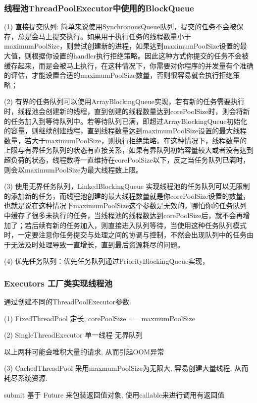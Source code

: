 \subsubsection{线程池ThreadPoolExecutor中使用的BlockQueue}
(1) 直接提交队列: 简单来说使用SynchronousQueue队列，提交的任务不会被保存，总是会马上提交执行。如果用于执行任务的线程数量小于maximumPoolSize，则尝试创建新的进程，如果达到maximumPoolSize设置的最大值，则根据你设置的handler执行拒绝策略。因此这种方式你提交的任务不会被缓存起来，而是会被马上执行，在这种情况下，你需要对你程序的并发量有个准确的评估，才能设置合适的maximumPoolSize数量，否则很容易就会执行拒绝策略；\par
(2) 有界的任务队列可以使用ArrayBlockingQueue实现，若有新的任务需要执行时，线程池会创建新的线程，直到创建的线程数量达到corePoolSize时，则会将新的任务加入到等待队列中。若等待队列已满，即超过ArrayBlockingQueue初始化的容量，则继续创建线程，直到线程数量达到maximumPoolSize设置的最大线程数量，若大于maximumPoolSize，则执行拒绝策略。在这种情况下，线程数量的上限与有界任务队列的状态有直接关系，如果有界队列初始容量较大或者没有达到超负荷的状态，线程数将一直维持在corePoolSize以下，反之当任务队列已满时，则会以maximumPoolSize为最大线程数上限。\par
(3) 使用无界任务队列，LinkedBlockingQueue 实现线程池的任务队列可以无限制的添加新的任务，而线程池创建的最大线程数量就是你corePoolSize设置的数量，也就是说在这种情况下maximumPoolSize这个参数是无效的，哪怕你的任务队列中缓存了很多未执行的任务，当线程池的线程数达到corePoolSize后，就不会再增加了；若后续有新的任务加入，则直接进入队列等待，当使用这种任务队列模式时，一定要注意你任务提交与处理之间的协调与控制，不然会出现队列中的任务由于无法及时处理导致一直增长，直到最后资源耗尽的问题。 \par
(4) 优先任务队列：优先任务队列通过PriorityBlockingQueue实现，
\subsubsection{Executors 工厂类实现线程池}
通过创建不同的ThreadPoolExecutor参数.\par
(1) FixedThreadPool 定长, corePoolSize == maxmumPoolSize   \par
(2) SingleThreadExecutor 单一线程 无界队列 \par
以上两种可能会堆积大量的请求, 从而引起OOM异常 \par
(3) CachedThreadPool 采用maxmumPoolSize为无限大, 容易创建大量线程, 从而耗尽系统资源. \par

submit  基于  Future 来包装返回值对象, 使用callable来进行调用有返回值

